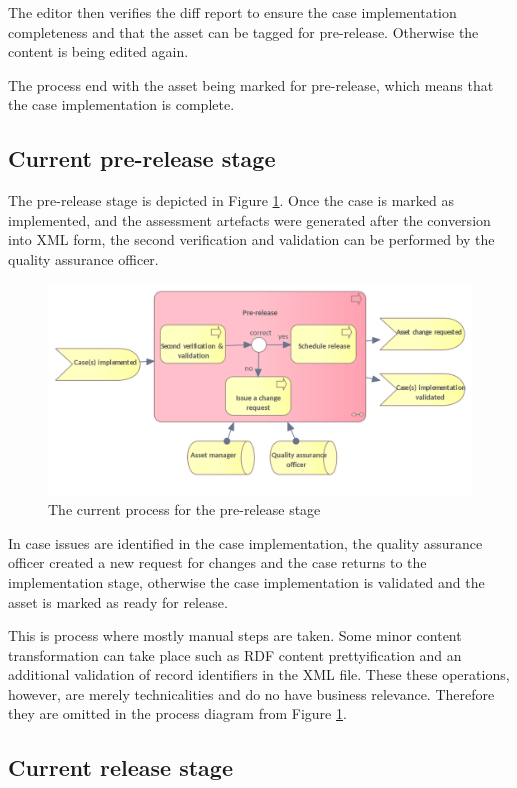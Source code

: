 	The editor then verifies the diff report to ensure the case implementation completeness and that the asset can be tagged for pre-release. Otherwise the content is being edited again. 
	
	The process end with the asset being marked for pre-release, which means that the case implementation is complete.
	
	\subsection{Current pre-release stage}
	\label{sec:pre-release-current}	

	The pre-release stage is depicted in Figure \ref{fig:pre-release-current}. Once the case is marked as implemented, and the assessment artefacts were generated after the conversion into XML form, the second verification and validation can be performed by the quality assurance officer. 
	
	\begin{figure}[h]
		\centering
		\includegraphics[width=.65\textwidth]{images/business/current/Pre-release.png}
		\caption{The current process for the pre-release stage}
		\label{fig:pre-release-current}
	\end{figure}

	In case issues are identified in the case implementation, the quality assurance officer created a new request for changes and the case returns to the implementation stage, otherwise the case implementation is validated and the asset is marked as ready for release. 
	
	This is process where mostly manual steps are taken. Some minor content transformation can take place such as RDF content prettyification and an additional validation of record identifiers in the XML file. These these operations, however, are merely technicalities and do no have business relevance. Therefore they are omitted in the process diagram from Figure \ref{fig:pre-release-current}. 

	\subsection{Current release stage}
	\label{sec:release-current}
	
